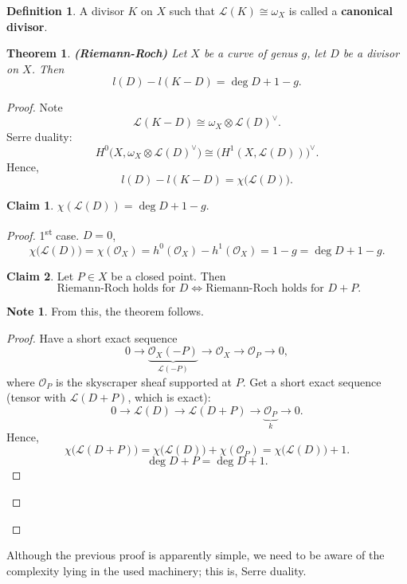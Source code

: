 \documentclass[12pt]{article}
\newtheorem*{theorem}{Theorem}
\theoremstyle{definition}
\newtheorem*{definition}{Definition}
\newtheorem*{note}{Note}
\newtheorem*{claim}{Claim}
\begin{document}
\begin{definition}
A divisor $K$ on $X$ such that $\mathcal{L}(K)\cong\omega_X$ is called a \textbf{canonical divisor}.
\end{definition}

\begin{theorem}
\emph{\textbf{(Riemann-Roch)}} Let $X$ be a curve of genus $g$, let $D$ be a divisor on $X$. Then
\[l(D)-l(K-D)=\deg D+1-g.\]
\end{theorem}

\begin{proof}
Note
\[\mathcal{L}(K-D)\cong\omega_X\otimes\mathcal{L}(D)^{\vee}.\]
Serre duality:
\[H^0\big(X,\omega_X\otimes\mathcal{L}(D)^{\vee}\big)\cong\big(H^1(X,\mathcal{L}(D))\big)^{\vee}.\]
Hence,
\[l(D)-l(K-D)=\chi\big(\mathcal{L}(D)\big).\]
\begin{claim}
$\chi(\mathcal{L}(D))=\deg D+1-g$.
\end{claim}
\begin{proof}
1\textsuperscript{st} case. $D=0$,
\[\chi\big(\mathcal{L}(D)\big)=\chi(\mathcal{O}_X)=h^0(\mathcal{O}_X)-h^1(\mathcal{O}_X)=1-g=\deg D+1-g.\]
\begin{claim}
Let $P\in X$ be a closed point. Then
\[\text{ Riemann-Roch holds for }D\Longleftrightarrow\text{Riemann-Roch holds for }D+P.\]
\end{claim}
\begin{note}
From this, the theorem follows.
\end{note}
\begin{proof}
Have a short exact sequence
\[0\longrightarrow\underbrace{\mathcal{O}_X(-P)}_{\mathcal{L}(-P)}\longrightarrow\mathcal{O}_X\longrightarrow\mathcal{O}_P\longrightarrow0,\]
where $\mathcal{O}_P$ is the skyscraper sheaf supported at $P$. Get a short exact sequence (tensor with $\mathcal{L}(D+P)$, which is exact):
\[0\longrightarrow\mathcal{L}(D)\longrightarrow\mathcal{L}(D+P)\longrightarrow\underbrace{\mathcal{O}_P}_k\longrightarrow0.\]
Hence,
\[\chi\big(\mathcal{L}(D+P)\big)=\chi\big(\mathcal{L}(D)\big)+\chi(\mathcal{O}_P)=\chi\big(\mathcal{L}(D)\big)+1.\]
\[\deg D+P=\deg D+1.\]
\end{proof}
\end{proof}
\end{proof}

Although the previous proof is apparently simple, we need to be aware of the complexity lying in the used machinery; this is, Serre duality.
\end{document}
